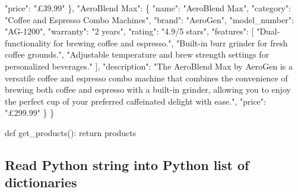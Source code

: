 \documentclass[
  letterpaper,
  DIV=11,
  numbers=noendperiod]{scrreprt}
\newenvironment{Shaded}{\begin{snugshade}}{\end{snugshade}}
\newcommand{\ControlFlowTok}[1]{\textcolor[rgb]{0.00,0.23,0.31}{#1}}
\newcommand{\KeywordTok}[1]{\textcolor[rgb]{0.00,0.23,0.31}{#1}}
\newcommand{\NormalTok}[1]{\textcolor[rgb]{0.00,0.23,0.31}{#1}}
\newcommand{\StringTok}[1]{\textcolor[rgb]{0.13,0.47,0.30}{#1}}
\begin{document}
\begin{Shaded}
\begin{Highlighting}[]
      \StringTok{"price"}\NormalTok{: }\StringTok{"£39.99"}
\NormalTok{    \},}
    \StringTok{"AeroBlend Max"}\NormalTok{: \{}
      \StringTok{"name"}\NormalTok{: }\StringTok{"AeroBlend Max"}\NormalTok{,}
      \StringTok{"category"}\NormalTok{: }\StringTok{"Coffee and Espresso Combo Machines"}\NormalTok{,}
      \StringTok{"brand"}\NormalTok{: }\StringTok{"AeroGen"}\NormalTok{,}
      \StringTok{"model\_number"}\NormalTok{: }\StringTok{"AG{-}1200"}\NormalTok{,}
      \StringTok{"warranty"}\NormalTok{: }\StringTok{"2 years"}\NormalTok{,}
      \StringTok{"rating"}\NormalTok{: }\StringTok{"4.9/5 stars"}\NormalTok{,}
      \StringTok{"features"}\NormalTok{: [}
        \StringTok{"Dual{-}functionality for brewing coffee and espresso."}\NormalTok{,}
        \StringTok{"Built{-}in burr grinder for fresh coffee grounds."}\NormalTok{,}
        \StringTok{"Adjustable temperature and brew strength settings for personalized beverages."}
\NormalTok{      ],}
      \StringTok{"description"}\NormalTok{: }\StringTok{"The AeroBlend Max by AeroGen is a versatile coffee and espresso combo machine that combines the convenience of brewing both coffee and espresso with a built{-}in grinder, allowing you to enjoy the perfect cup of your preferred caffeinated delight with ease."}\NormalTok{,}
      \StringTok{"price"}\NormalTok{: }\StringTok{"£299.99"}
\NormalTok{    \}}
\NormalTok{\}}
\end{Highlighting}
\end{Shaded}

\begin{Shaded}
\begin{Highlighting}[]
\KeywordTok{def}\NormalTok{ get\_products():}
    \ControlFlowTok{return}\NormalTok{ products}
\end{Highlighting}
\end{Shaded}

\hypertarget{read-python-string-into-python-list-of-dictionaries}{%
\subsection{Read Python string into Python list of
dictionaries}\label{read-python-string-into-python-list-of-dictionaries}}
\end{document}
